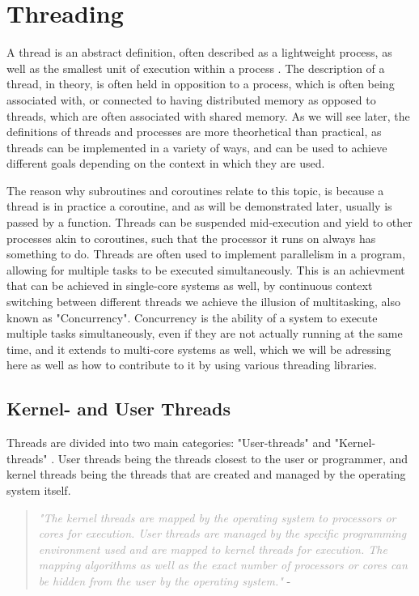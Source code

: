 \documentclass[12pt,a4paper]{article}
\begin{document}
\section{Threading}

A thread is an abstract definition, often described as a lightweight process, as well as the smallest unit of execution within a process \parencite{Rauber2023}. The description of a thread, in theory, is often held in opposition to a process, which is often being associated with, or connected to having distributed memory\parencite[p. 4, 27]{Rauber2023} as opposed to threads, which are often associated with shared memory. As we will see later, the definitions of threads and processes are more theorhetical than practical, as threads can be implemented in a variety of ways, and can be used to achieve different goals depending on the context in which they are used.

The reason why subroutines and coroutines relate to this topic, is because a thread is in practice a coroutine, and as will be demonstrated later, usually is passed by a function. Threads can be suspended mid-execution and yield to other processes akin to coroutines, such that the processor it runs on always has something to do. Threads are often used to implement parallelism in a program\parencite[p. 27]{Rauber2023}, allowing for multiple tasks to be executed simultaneously. This is an achievment that can be achieved in single-core systems as well, by continuous context switching between different threads\parencite{Rauber2023} we achieve the illusion of multitasking, also known as "Concurrency". Concurrency is the ability of a system to execute multiple tasks simultaneously, even if they are not actually running at the same time, and it extends to multi-core systems as well, which we will be adressing here as well as how to contribute to it by using various threading libraries.

\subsection{Kernel- and User Threads}

Threads are divided into two main categories: "User-threads" and "Kernel-threads" \parencite[p. 27]{Rauber2023}. User threads being the threads closest to the user or programmer, and kernel threads being the threads that are created and managed by the operating system itself.

\begin{quote}
    \textit{\textcolor{darkgray}{"The kernel threads are mapped by the operating system to processors or cores for execution. User threads are managed by the specific programming environment used and are mapped to kernel threads for execution. The mapping algorithms as well as the exact number of processors or cores can be hidden from the user by the operating system."}} - \parencite[p. 27]{Rauber2023}
\end{quote}
\end{document}
